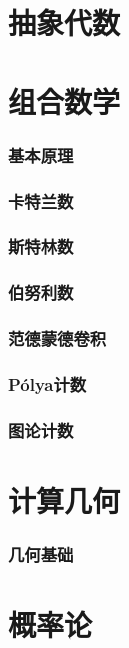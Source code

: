 \documentclass[12pt,a4paper]{article}
\begin{document}
\newpage
\part{抽象代数}

\newpage
\part{组合数学}
\section{基本原理} %

\newpage
\section{卡特兰数}

\newpage
\section{斯特林数}

\newpage
\section{伯努利数}

\newpage
\section{范德蒙德卷积}

\newpage
\section{Pólya计数} %

\newpage
\section{图论计数}

\newpage
\part{计算几何}
\section{几何基础}

\newpage
\part{概率论}
\end{document}
